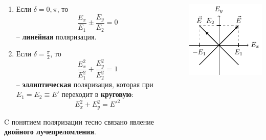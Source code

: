 \documentclass[10pt,pdf,hyperref={unicode}, dvipsnames]{beamer}
\begin{document}
\begin{frame}
	\begin{columns}
		\begin{column}{0.7\textwidth}
			\begin{enumerate}
				\item Если $\delta=0, \pi$, то
				      \begin{equation*}				
					      \frac{E_x}{E_1}\pm\frac{E_y}{E_2}=0
				      \end{equation*}
				      -- \textbf{линейная} поляризация.
				      \vspace{1em}
				\item Если $\delta=\frac{\pi}{2}$, то\\
				      \begin{equation*}				
					      \frac{E_x^2}{E_1^2}+\frac{E_y^2}{E_2^2}=1				
				      \end{equation*}
				      -- \textbf{эллиптическая} поляризация, которая при $E_1=E_2 \equiv E'$ переходит в \textbf{круговую}:
				      \begin{equation*}				
					      E_x^2+E_y^2=E'^2
				      \end{equation*}
			\end{enumerate}
			C понятием поляризации тесно связано явление \textbf{двойного лучепреломления}.
		\end{column}
		\begin{column}{0.3\textwidth}
			\includegraphics[width=\textwidth]{images/linear_polarisation}\\

\end{column}
\end{columns}
\end{frame}
\end{document}
